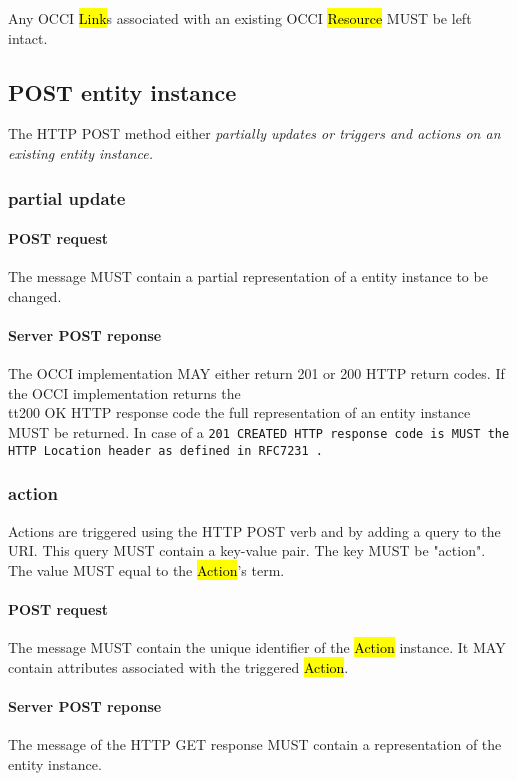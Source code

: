 \documentclass[10pt,a4paper]{article}
\begin{document}
Any OCCI \hl{Link}s associated with an existing OCCI \hl{Resource} MUST be left intact.

\subsection{POST entity instance}
The HTTP POST method either \em{partially updates} or triggers and \em{actions} on an existing entity instance.

\subsubsection{partial update}

\paragraph{POST request}
The message MUST contain a partial representation of a entity instance to be changed.

\paragraph{Server POST reponse}
The OCCI implementation MAY either return 201 or 200 HTTP return codes. If the OCCI implementation
returns the \\tt{200 OK} HTTP response code the full representation of an entity instance MUST be returned. 
In case of a \tt{201 CREATED} HTTP response code is MUST the HTTP Location header as defined in RFC7231 \cite{rfc7231}.

\subsubsection{action}
Actions are triggered using the HTTP POST verb and by adding a query to the URI. This query MUST contain a key-value pair. The key MUST be "action". The value MUST equal to the \hl{Action}'s term.

\paragraph{POST request}
The message MUST contain the unique identifier of the \hl{Action} instance. It MAY contain attributes associated with the triggered \hl{Action}.

\paragraph{Server POST reponse}
The message of the HTTP GET response MUST contain a representation of the entity instance.
\end{document}
